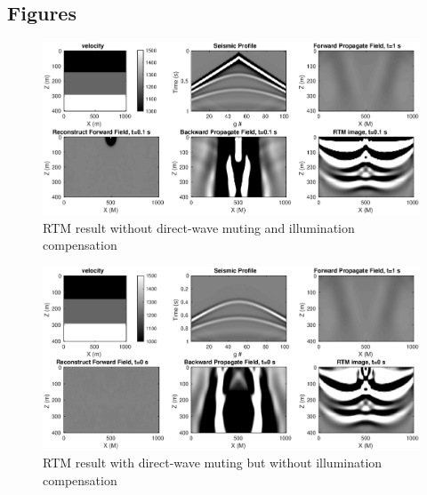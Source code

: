 \documentclass[a4paper]{article}
\begin{document}
	\subsection{Figures}
	\begin{figure}[ht]
		\centering
		\includegraphics[width=1\linewidth]{./fig/RTM_run_noc.eps}
		\caption{RTM result without direct-wave muting and illumination compensation}
		\label{RTM_noc}
	\end{figure}
	\begin{figure}[ht]
		\centering
		\includegraphics[width=1\linewidth]{./fig/RTM_run_mute.eps}
		\caption{RTM result with direct-wave muting but without illumination compensation}
		\label{RTM_noc_mute}
	\end{figure}
\end{document}
